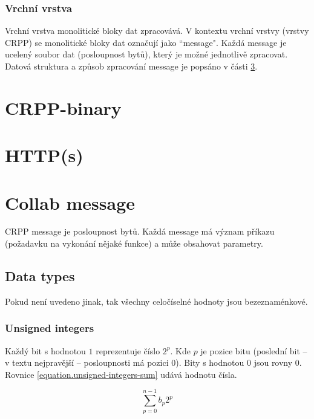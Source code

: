 \documentclass[12pt,oneside,a4paper]{report}
\begin{document}
\subsection{Vrchní vrstva}

Vrchní vrstva monolitické bloky dat zpracovává. V kontextu vrchní vrstvy (vrstvy CRPP) se monolitické bloky dat označují jako ``message". Každá message je ucelený soubor dat (posloupnost bytů), který je možné jednotlivě zpracovat. Datová struktura a způsob zpracování message je popsáno v části \ref{text.collab_message}.

\chapter{CRPP-binary}
\label{chapter.crpp-binary}


\chapter{HTTP(s)}
\label{chapter.http}


\chapter{Collab message}
\label{text.collab_message}

CRPP message je posloupnost bytů. Každá message má význam příkazu (požadavku na vykonání nějaké funkce) a může obsahovat parametry.

\section{Data types}

Pokud není uvedeno jinak, tak všechny celočíselné hodnoty jsou bezeznaménkové.

\subsection{Unsigned integers}
\label{subsection.unsigned-integers}

Každý bit s hodnotou $1$ reprezentuje číslo $2^{p}$. Kde $p$ je pozice bitu (poslední bit -- v textu nejpravější -- posloupnosti má pozici $0$). Bity s hodnotou $0$ jsou rovny $0$. Rovnice \ref{equation.unsigned-integers-sum} udává hodnotu čísla.

\begin{equation}
\label{equation.unsigned-integers-sum}
\sum_{p = 0}^{n - 1} b_p 2^p
\end{equation}
\end{document}
